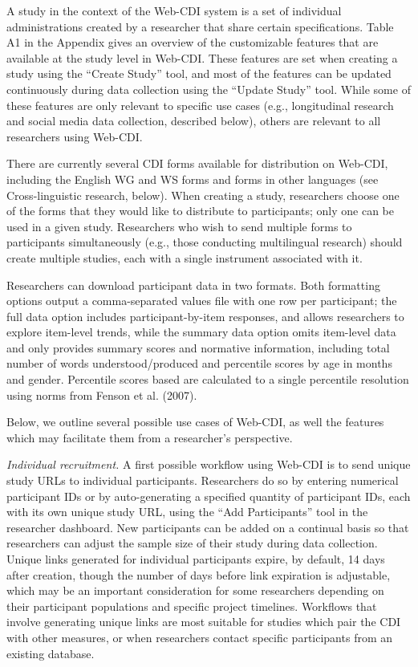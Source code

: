 \documentclass[
  english,
  ,man,floatsintext]{apa6}
\begin{document}
A study in the context of the Web-CDI system is a set of individual administrations created by a researcher that share certain specifications. Table A1 in the Appendix gives an overview of the customizable features that are available at the study level in Web-CDI. These features are set when creating a study using the ``Create Study'' tool, and most of the features can be updated continuously during data collection using the ``Update Study'' tool. While some of these features are only relevant to specific use cases (e.g., longitudinal research and social media data collection, described below), others are relevant to all researchers using Web-CDI.

There are currently several CDI forms available for distribution on Web-CDI, including the English WG and WS forms and forms in other languages (see Cross-linguistic research, below). When creating a study, researchers choose one of the forms that they would like to distribute to participants; only one can be used in a given study. Researchers who wish to send multiple forms to participants simultaneously (e.g., those conducting multilingual research) should create multiple studies, each with a single instrument associated with it.

Researchers can download participant data in two formats. Both formatting options output a comma-separated values file with one row per participant; the full data option includes participant-by-item responses, and allows researchers to explore item-level trends, while the summary data option omits item-level data and only provides summary scores and normative information, including total number of words understood/produced and percentile scores by age in months and gender. Percentile scores based are calculated to a single percentile resolution using norms from Fenson et al. (2007).

Below, we outline several possible use cases of Web-CDI, as well the features which may facilitate them from a researcher's perspective.

\emph{Individual recruitment.} A first possible workflow using Web-CDI is to send unique study URLs to individual participants. Researchers do so by entering numerical participant IDs or by auto-generating a specified quantity of participant IDs, each with its own unique study URL, using the ``Add Participants'' tool in the researcher dashboard. New participants can be added on a continual basis so that researchers can adjust the sample size of their study during data collection. Unique links generated for individual participants expire, by default, 14 days after creation, though the number of days before link expiration is adjustable, which may be an important consideration for some researchers depending on their participant populations and specific project timelines. Workflows that involve generating unique links are most suitable for studies which pair the CDI with other measures, or when researchers contact specific participants from an existing database.
\end{document}
